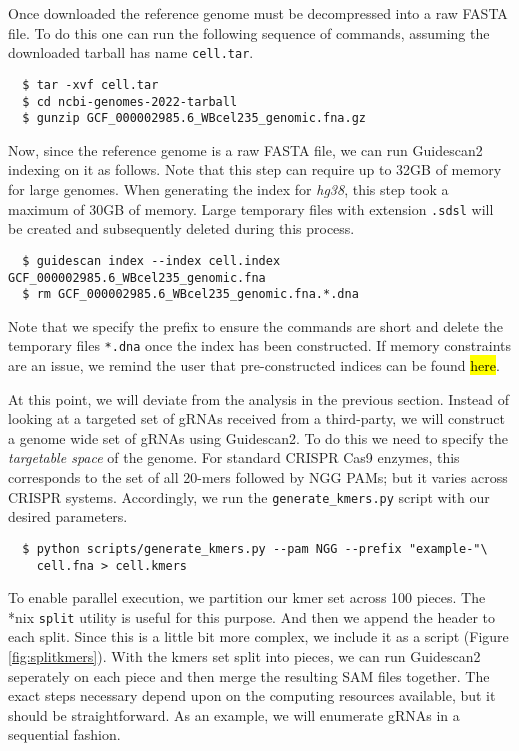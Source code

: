 \documentclass[11pt]{article}
\begin{document}
Once downloaded the reference genome must be decompressed into a raw
FASTA file.  To do this one can run the following sequence of
commands, assuming the downloaded tarball has name \texttt{cell.tar}.

\begin{verbatim}
  $ tar -xvf cell.tar
  $ cd ncbi-genomes-2022-tarball
  $ gunzip GCF_000002985.6_WBcel235_genomic.fna.gz
\end{verbatim}

Now, since the reference genome is a raw FASTA file, we can run
Guidescan2 indexing on it as follows. Note that this step can require
up to 32GB of memory for large genomes. When generating the index for
\textit{hg38}, this step took a maximum of 30GB of memory. Large
temporary files with extension \texttt{.sdsl} will be created and
subsequently deleted during this process.

\begin{verbatim}
  $ guidescan index --index cell.index GCF_000002985.6_WBcel235_genomic.fna
  $ rm GCF_000002985.6_WBcel235_genomic.fna.*.dna
\end{verbatim}

Note that we specify the prefix to ensure the commands are short and
delete the temporary files \texttt{*.dna} once the index has been
constructed. If memory constraints are an issue, we remind the user
that pre-constructed indices can be found \hl{here}.

At this point, we will deviate from the analysis in the previous
section. Instead of looking at a targeted set of gRNAs received from a
third-party, we will construct a genome wide set of gRNAs using
Guidescan2. To do this we need to specify the {\it targetable space}
of the genome. For standard CRISPR Cas9 enzymes, this corresponds to
the set of all 20-mers followed by NGG PAMs; but it varies across
CRISPR systems. Accordingly, we run the \texttt{generate\_kmers.py}
script with our desired parameters.

\begin{verbatim}
  $ python scripts/generate_kmers.py --pam NGG --prefix "example-"\
    cell.fna > cell.kmers
\end{verbatim}

To enable parallel execution, we partition our kmer set across 100
pieces. The *nix \texttt{split} utility is useful for this
purpose. And then we append the header to each split. Since this is a
little bit more complex, we include it as a script (Figure
\ref{fig:splitkmers}). With the kmers set split into pieces, we can
run Guidescan2 seperately on each piece and then merge the resulting
SAM files together. The exact steps necessary depend upon on the
computing resources available, but it should be straightforward. As an
example, we will enumerate gRNAs in a sequential fashion.
\end{document}
